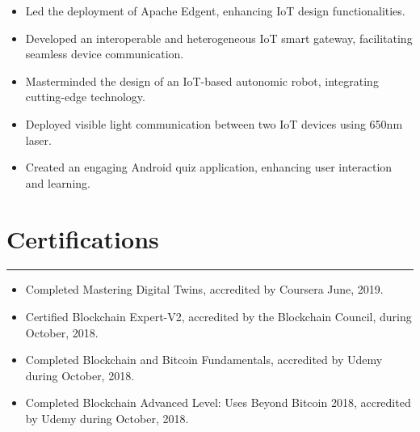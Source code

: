 \documentclass[10pt, a4paper]{article}
\begin{document}
\begin{itemize}[leftmargin=*]
\item Led the deployment of Apache Edgent, enhancing IoT design functionalities.
\vspace*{-2mm}
\item Developed an interoperable and heterogeneous IoT smart gateway, facilitating seamless device communication.
\vspace*{-2mm}
\item Masterminded the design of an IoT-based autonomic robot, integrating cutting-edge technology.
\vspace*{-2mm}
\item Deployed visible light communication between two IoT devices using 650nm laser.
\vspace*{-2mm}
\item Created an engaging Android quiz application, enhancing user interaction and learning.    \end{itemize}
     		
	\section*{Certifications}
	\vspace*{-2.5mm}
	\hrule 
	\vspace*{2mm}
	\begin{itemize}[leftmargin=*]
		\item Completed Mastering Digital Twins, accredited by Coursera June, 2019.
		\vspace*{-2mm}
		\item	Certified Blockchain Expert-V2, accredited by the Blockchain Council, during October, 2018.
			\vspace*{-2mm}
			\item	Completed Blockchain and Bitcoin Fundamentals, accredited by Udemy during October, 2018.
			\vspace*{-2mm}
		\item	Completed Blockchain Advanced Level: Uses Beyond Bitcoin 2018, accredited by Udemy during October, 2018.
		
	\end{itemize}
	
	
\end{document}
